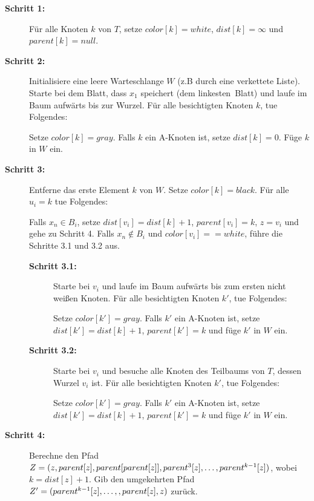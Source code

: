     \begin{description}
    	\item[\textbf{Schritt 1:}] Für alle Knoten $k$ von $T$, setze $color[k] = white$, $dist[k] = \infty$ und $parent[k] = null$.
    	
    	\item[\textbf{Schritt 2:}] Initialisiere eine leere Warteschlange $W$ (z.B durch eine verkettete Liste).
    	Starte bei dem Blatt, dass $x_1$ speichert (dem \glqq linkesten\grqq\ Blatt) und laufe im Baum aufwärts bis zur Wurzel. 
    	Für alle besichtigten Knoten $k$, tue Folgendes: 
    	
		    Setze $color[k] = gray$.
    		Falls $k$ ein A-Knoten ist, setze $dist[k] = 0$.
    		Füge $k$ in $W$ ein.
    		
    	\item[\textbf{Schritt 3:}] Entferne das erste Element $k$ von $W$. Setze $color[k] = black$.
    	Für alle $u_i = k$ tue Folgendes:
    	
    	Falls $x_n \in B_i$, setze $dist[v_i] = dist[k] + 1$, $parent[v_i] = k$, $z = v_i$ und gehe zu Schritt 4.\n
    	Falls $x_n \notin B_i$ und $color[v_i] == white$, führe die Schritte 3.1 und 3.2 aus.
    	\begin{description}
    		\item[\textbf{Schritt 3.1:}] Starte bei $v_i$ und laufe im Baum aufwärts bis zum ersten nicht weißen Knoten. Für alle besichtigten Knoten $k'$, tue Folgendes:
    		
    		Setze $color[k'] = gray$. Falls $k'$ ein A-Knoten ist, setze $dist[k'] = dist[k]+1$, $parent[k'] = k$ und füge $k'$ in $W$ ein.
    		
    		\item[\textbf{Schritt 3.2:}] Starte bei $v_i$ und besuche alle Knoten des Teilbaums von $T$, dessen Wurzel $v_i$ ist. Für alle besichtigten Knoten $k'$, tue Folgendes:
    		
    		Setze $color[k'] = gray$. Falls $k'$ ein A-Knoten ist, setze $dist[k'] = dist[k] + 1$, $parent[k']	= k$ und füge $k'$ in $W$ ein.
    	\end{description}
    	
    	\item[\textbf{Schritt 4:}] Berechne den Pfad $Z = (z, parent[z], parent[parent[z]], parent^3[z],  \mathellipsis, parent^{k-1}[z])$, wobei $k = dist[z] + 1$. Gib den umgekehrten Pfad $Z' = (parent^{k-1}[z], \mathellipsis,, parent[z], z)$ zurück.
    \end{description}
    
